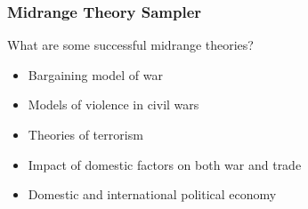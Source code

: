 \documentclass{beamer}
\begin{document}
\begin{frame} 
	\frametitle{\LARGE{Midrange Theory Sampler}}
	What are some successful midrange theories?
	\begin{itemize}
		\item Bargaining model of war \pause
		\item Models of violence in civil wars \pause
		\item Theories of terrorism \pause
		\item Impact of domestic factors on both war and trade \pause
		\item Domestic and international political economy		
	\end{itemize}
\end{frame}
\end{document}
